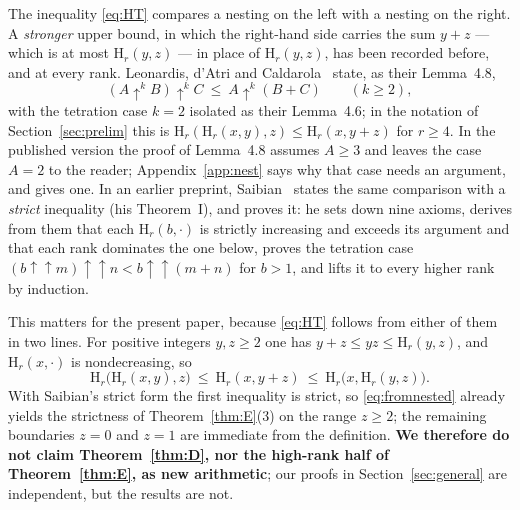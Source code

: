\documentclass[11pt,a4paper]{article}
\theoremstyle{plain}
\theoremstyle{definition}
\newcommand{\HH}{\mathrm{H}}
\begin{document}
The inequality \eqref{eq:HT} compares a nesting on the left with a nesting on the
right. A \emph{stronger} upper bound, in which the right-hand side carries the sum
$y+z$ --- which is at most $\HH_r(y,z)$ --- in place of $\HH_r(y,z)$, has been recorded
before, and at every rank.
Leonardis, d'Atri and Caldarola~\cite{LdC} state, as their Lemma~4.8,
\[
  (A\uparrow^{k}B)\uparrow^{k}C\ \le\ A\uparrow^{k}(B+C)
  \qquad(k\ge2),
\]
with the tetration case $k=2$ isolated as their Lemma~4.6; in the notation of
Section~\ref{sec:prelim} this is $\HH_r(\HH_r(x,y),z)\le\HH_r(x,y+z)$ for $r\ge4$. In
the published version the proof of Lemma~4.8 assumes $A\ge3$ and leaves the case $A=2$
to the reader; Appendix~\ref{app:nest} says why that case needs an argument, and gives
one.
In an earlier preprint, Saibian~\cite{Sai} states the same comparison with a
\emph{strict} inequality (his Theorem~I), and proves it: he sets down nine axioms,
derives from them that each $\HH_r(b,\cdot)$ is strictly increasing and exceeds its
argument and that each rank dominates the one below, proves the tetration case
$(b\uparrow\uparrow m)\uparrow\uparrow n<b\uparrow\uparrow(m+n)$ for $b>1$, and lifts it
to every higher rank by induction.

This matters for the present paper, because \eqref{eq:HT} follows from either of them
in two lines. For positive integers $y,z\ge2$ one has $y+z\le yz\le\HH_r(y,z)$, and
$\HH_r(x,\cdot)$ is nondecreasing, so
\begin{equation}\label{eq:fromnested}
  \HH_r\bigl(\HH_r(x,y),z\bigr)\ \le\ \HH_r(x,y+z)\ \le\ \HH_r\bigl(x,\HH_r(y,z)\bigr).
\end{equation}
With Saibian's strict form the first inequality is strict, so \eqref{eq:fromnested}
already yields the strictness of Theorem~\ref{thm:E}(3) on the range $z\ge2$; the
remaining boundaries $z=0$ and $z=1$ are immediate from the definition. \textbf{We
therefore do not claim Theorem~\ref{thm:D}, nor the high-rank half of
Theorem~\ref{thm:E}, as new arithmetic}; our proofs in Section~\ref{sec:general} are
independent, but the results are not.
\end{document}
